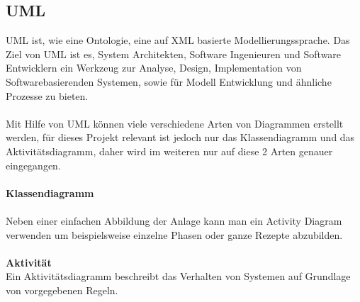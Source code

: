 \subsection{UML}
UML ist, wie eine Ontologie, eine auf XML basierte Modellierungssprache.
Das Ziel von UML ist es, System Architekten, Software Ingenieuren und Software Entwicklern ein Werkzeug zur Analyse, Design, Implementation von Softwarebasierenden Systemen, sowie für Modell Entwicklung und ähnliche Prozesse zu bieten.\\
\\
Mit Hilfe von UML können viele verschiedene Arten von Diagrammen erstellt werden, für dieses Projekt relevant ist jedoch nur das Klassendiagramm und das Aktivitätsdiagramm, daher wird im weiteren nur auf diese 2 Arten genauer eingegangen.\\
\\
\textbf{Klassendiagramm}\\
\\
Neben einer einfachen Abbildung der Anlage kann man ein Activity Diagram verwenden um beispielsweise einzelne Phasen oder ganze Rezepte abzubilden.\\
\\
\textbf{Aktivität}\\
Ein Aktivitätsdiagramm beschreibt das Verhalten von Systemen auf Grundlage von vorgegebenen Regeln. 


